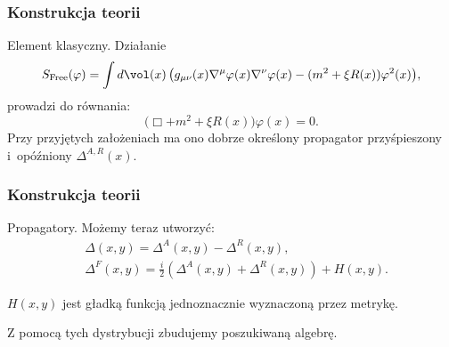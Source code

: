 \documentclass[10pt,t]{beamer}
\begin{document}
\begin{frame}
  \frametitle{Konstrukcja teorii}


  Element klasyczny. Działanie
  \begin{equation}
    \label{eq:Rachunek-zaburzen-06}
    S_{ \textrm{Free} }( \varphi ) =
    \int d \vol( x ) \, \big( g_{ \mu \nu }( x ) \nabla^{ \mu } \varphi( x ) \nabla^{ \nu } \varphi( x )
    - ( m^{ 2 } + \xi R( x ) ) \varphi^{ 2 }( x ) \big),
  \end{equation}
  prowadzi do równania:
  \begin{equation}
    \label{eq:Rachunek-zaburzen-07}
    \big( \Box  + m^{ 2 } + \xi R( x ) \big) \varphi( x ) = 0.
  \end{equation}
  Przy przyjętych założeniach ma ono dobrze określony propagator
  przyśpieszony i~opóźniony $\Delta^{ A, R }( x )$.

\end{frame}





\begin{frame}
  \frametitle{Konstrukcja teorii}


  Propagatory. Możemy teraz utworzyć:
  \begin{subequations}
    \begin{align}
      \label{eq:Rachunek-zaburzen-08-A}
      &\Delta( x, y ) = \Delta^{ A }( x, y ) - \Delta^{ R }( x, y ), \\
      \label{eq:Rachunek-zaburzen-08-B}
      &\Delta^{ F }( x, y ) =
        \frac{ i }{ 2 } \left( \Delta^{ A }( x, y ) + \Delta^{ R }( x, y ) \right)
        + H( x, y ).
    \end{align}
  \end{subequations}

  $H( x, y )$ jest gładką funkcją jednoznacznie wyznaczoną przez metrykę.

  Z pomocą tych dystrybucji zbudujemy poszukiwaną algebrę.

\end{frame}
\end{document}
